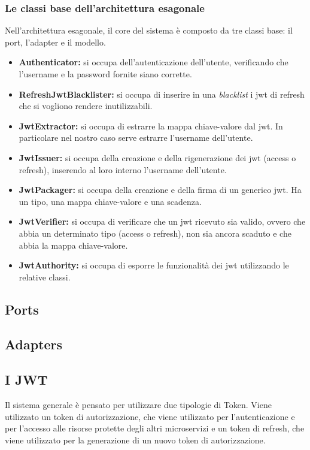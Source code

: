 \subsubsection{Le classi base dell'architettura esagonale}

Nell'architettura esagonale, il core del sistema è composto da tre classi base: il port, l'adapter e il modello.

\begin{itemize}
    \item \textbf{Authenticator:} si occupa dell'autenticazione dell'utente, verificando che l'username e la password fornite siano corrette.
    \item \textbf{RefreshJwtBlacklister:} si occupa di inserire in una \textit{blacklist} i jwt di refresh che si vogliono rendere inutilizzabili.
    \item \textbf{JwtExtractor:} si occupa di estrarre la mappa chiave-valore dal jwt. In particolare nel nostro caso serve estrarre l'username dell'utente.
    \item \textbf{JwtIssuer:} si occupa della creazione e della rigenerazione dei jwt (access o refresh), inserendo al loro interno l'username dell'utente.
    \item \textbf{JwtPackager:} si occupa della creazione e della firma di un generico jwt. Ha un tipo, una mappa chiave-valore e una scadenza.
    \item \textbf{JwtVerifier:} si occupa di verificare che un jwt ricevuto sia valido, ovvero che abbia un determinato tipo (access o refresh), non sia ancora scaduto e che abbia la mappa chiave-valore.
    \item \textbf{JwtAuthority:} si occupa di esporre le funzionalità dei jwt utilizzando le relative classi.
\end{itemize}

\subsection{Ports}
\subsection{Adapters}
\subsection{I JWT}

Il sistema generale è pensato per utilizzare due tipologie di Token. Viene utilizzato un token di autorizzazione, che viene utilizzato per l'autenticazione e per l'accesso alle risorse protette degli altri microservizi e un token di refresh, che viene utilizzato per la generazione di un nuovo token di autorizzazione.

